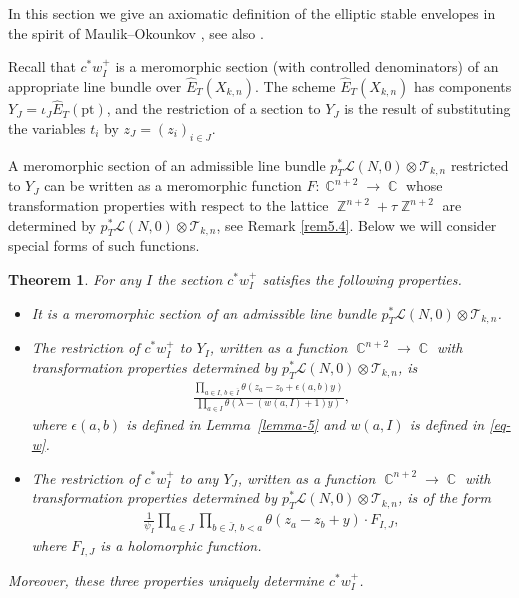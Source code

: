 \documentclass[pdftex]{sigma}
\numberwithin{equation}{section}
\newtheorem{Theorem}{Theorem}[section]
\DeclareMathOperator\C{\mathbb C}
\DeclareMathOperator\Z{\mathbb Z}
\begin{document}
In this section we give an axiomatic definition of the elliptic stable envelopes in the spirit of Maulik--Okounkov \cite[Section 3.3]{MO}, see also \cite{RTV, RTV2, RV2}.

Recall that $c ^*w^+_I$ is a meromorphic section (with controlled denominators) of an appropriate line bundle over $\hat{E}_T(X_{k,n})$. The scheme $\hat{E}_T(X_{k,n})$ has components $Y_J=\iota_J \hat{E}_T(\mathrm{pt})$, and the restriction of a section to $Y_J$ is the result of substituting the variables $t_i$ by $z_J=(z_i)_{i\in J}$.

A meromorphic section of an admissible line bundle $p_T^*\mathcal L(N,0)\otimes \mathcal T_{k,n}$ restricted to $Y_J$ can be written as a meromorphic function $F\colon \C^{n+2} \to \C$ whose transformation properties with respect to the lattice $\Z^{n+2}+\tau \Z^{n+2}$ are determined by $p_T^*\mathcal L(N,0)\otimes \mathcal T_{k,n}$, see Remark \ref{rem5.4}. Below we will consider special forms of such functions.

\begin{Theorem} \label{thm:axiomatic}For any $I$ the section $c ^*w^+_I$ satisfies the following properties.
\begin{itemize}\itemsep=0pt
\item It is a meromorphic section of an admissible line bundle $p_T^*\mathcal L(N,0)\otimes \mathcal T_{k,n}$.
\item The restriction of $c ^*w^+_I$ to $Y_I$, written as a function $\C^{n+2}\to \C$ with transformation pro\-per\-ties determined by $p_T^*\mathcal L(N,0)\otimes \mathcal T_{k,n}$, is
 \begin{gather*}
 \frac {\prod\limits_{a\in I,\, b\in \bar I}\theta(z_a-z_b+\epsilon(a,b)y)} {\prod\limits_{a\in I}\theta(\lambda-(w(a,I)+1)y)},
 \end{gather*}
where $\epsilon(a,b)$ is defined in Lemma~{\rm \ref{lemma-5}} and $w(a,I)$ is defined in \eqref{eq-w}.
\item The restriction of $c ^*w^+_I$ to any $Y_J$, written as a function $\C^{n+2}\to \C$ with transformation properties determined by $p_T^*\mathcal L(N,0)\otimes \mathcal T_{k,n}$, is of the form
\begin{gather}\label{eqn:horizontal}
\frac{1}{\psi_I} \prod_{a\in J} \prod_{b\in \bar J,\, b<a} \theta(z_a-z_b+y) \cdot F_{I,J},
\end{gather}
where $F_{I,J}$ is a {\em holomorphic} function.
\end{itemize}
Moreover, these three properties uniquely determine $c ^*w^+_I$.
\end{Theorem}
\end{document}
